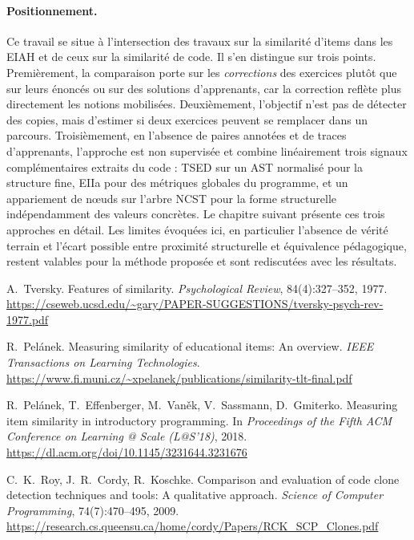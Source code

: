 \paragraph{Positionnement.} Ce travail se situe à l'intersection des travaux sur la similarité d'items dans les EIAH et de ceux sur la similarité de code. Il s'en distingue sur trois points. Premièrement, la comparaison porte sur les \emph{corrections} des exercices plutôt que sur leurs énoncés ou sur des solutions d'apprenants, car la correction reflète plus directement les notions mobilisées. Deuxièmement, l'objectif n'est pas de détecter des copies, mais d'estimer si deux exercices peuvent se remplacer dans un parcours. Troisièmement, en l'absence de paires annotées et de traces d'apprenants, l'approche est non supervisée et combine linéairement trois signaux complémentaires extraits du code : TSED sur un AST normalisé pour la structure fine, EIIa pour des métriques globales du programme, et un appariement de nœuds sur l'arbre NCST pour la forme structurelle indépendamment des valeurs concrètes. Le chapitre suivant présente ces trois approches en détail. Les limites évoquées ici, en particulier l'absence de vérité terrain et l'écart possible entre proximité structurelle et équivalence pédagogique, restent valables pour la méthode proposée et sont rediscutées avec les résultats.

\iffalse
{} A.~Tversky. \newblock Features of similarity. \newblock \emph{Psychological Review}, 84(4):327--352, 1977. \newblock \url{https://cseweb.ucsd.edu/~gary/PAPER-SUGGESTIONS/tversky-psych-rev-1977.pdf}

 R.~Pelánek. \newblock Measuring similarity of educational items: An overview. \newblock \emph{IEEE Transactions on Learning Technologies}. \newblock \url{https://www.fi.muni.cz/~xpelanek/publications/similarity-tlt-final.pdf}

 R.~Pelánek, T.~Effenberger, M.~Vaněk, V.~Sassmann, D.~Gmiterko. \newblock Measuring item similarity in introductory programming. \newblock In \emph{Proceedings of the Fifth ACM Conference on Learning @ Scale (L@S'18)}, 2018. \newblock \url{https://dl.acm.org/doi/10.1145/3231644.3231676}

 C.~K.~Roy, J.~R.~Cordy, R.~Koschke. \newblock Comparison and evaluation of code clone detection techniques and tools: A qualitative approach. \newblock \emph{Science of Computer Programming}, 74(7):470--495, 2009. \newblock \url{https://research.cs.queensu.ca/home/cordy/Papers/RCK_SCP_Clones.pdf}

